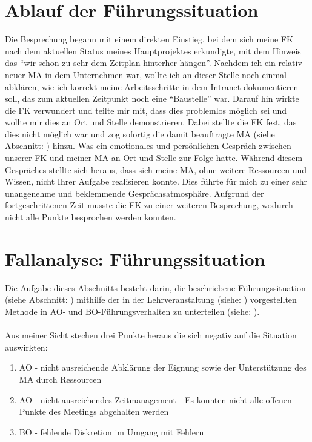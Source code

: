 \section{Ablauf der Führungssituation}
\label{subsec:ablauf_situation}
Die Besprechung begann mit einem direkten Einstieg, bei dem sich meine \ac{FK} nach dem aktuellen Status meines Hauptprojektes erkundigte, mit dem Hinweis das "`wir schon zu sehr dem Zeitplan hinterher hängen"'.
Nachdem ich ein relativ neuer \ac{MA} in dem Unternehmen war, wollte ich an dieser Stelle noch einmal abklären, wie ich korrekt meine Arbeitsschritte in dem Intranet dokumentieren soll, das zum aktuellen Zeitpunkt noch eine "`Baustelle"' war.
Darauf hin wirkte die \ac{FK} verwundert und teilte mir mit, dass dies problemlos möglich sei und wollte mir dies an Ort und Stelle demonstrieren. 
Dabei stellte die \ac{FK} fest, das dies nicht möglich war und zog sofortig die damit beauftragte \ac{MA} (siehe Abschnitt: ) hinzu.
Was ein emotionales und persönlichen Gespräch zwischen unserer \ac{FK} und meiner \ac{MA} an Ort und Stelle zur Folge hatte. 
Während diesem Gespräches stellte sich heraus, dass sich meine \ac{MA}, ohne weitere Ressourcen und Wissen, nicht Ihrer Aufgabe realisieren konnte. 
Dies führte für mich zu einer sehr unangenehme und beklemmende Gesprächsatmosphäre.
Aufgrund der fortgeschrittenen Zeit musste die \ac{FK} zu einer weiteren Besprechung, wodurch nicht alle Punkte besprochen werden konnten.

\pagebreak

\section{Fallanalyse: Führungssituation}
\label{sec:fallanalyse}
Die Aufgabe dieses Abschnitts besteht darin, die beschriebene Führungssituation (siehe Abschnitt: ) mithilfe der in der Lehrveranstaltung (siehe: \cite{Duden2015Skript}) vorgestellten Methode 
 in \ac{AO}- und \ac{BO}-Führungsverhalten zu unterteilen (siehe: \cite{Duden2015Aufgaben}).\\
\\
Aus meiner Sicht stechen drei Punkte heraus die sich negativ auf die Situation auswirkten:

\begin{enumerate}
\item \ac{AO} - nicht ausreichende Abklärung der Eignung sowie der Unterstützung des \ac{MA} durch Ressourcen
\item \ac{AO} - nicht ausreichendes Zeitmanagement  - Es konnten nicht alle offenen Punkte des Meetings abgehalten werden
\item \ac{BO} - fehlende Diskretion im Umgang mit Fehlern
\end{enumerate}





